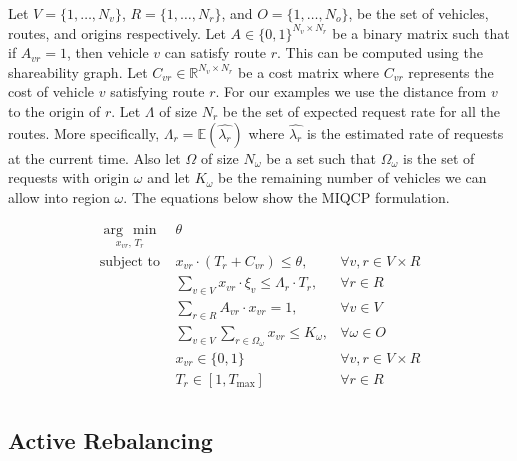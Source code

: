 \documentclass[letterpaper, 10pt, conference]{ieeeconf}
\newcommand{\argmin}[1]{\underset{#1}{\operatorname{arg}\,\operatorname{min}}\;}
\newcommand{\Max}[1]{\underset{#1}{\operatorname{max}}\;}
\newcommand{\Sum}[1]{\displaystyle\sum\limits_{#1}}
\begin{document}
Let $V = \{1, \ldots, N_v\}$, $R = \{1, \ldots, N_r\}$, and $O = \{1, \ldots,
N_o\}$, be the set of vehicles, routes, and origins respectively. Let $A \in
\{0, 1\}^{N_v \times N_r}$ be a binary matrix such that if $A_{vr} = 1$, then
vehicle $v$ can satisfy route $r$. This can be computed using the shareability
graph.  Let $C_{vr} \in \mathbb{R}^{N_v \times N_r}$ be a cost matrix where
$C_{vr}$ represents the cost of vehicle $v$ satisfying route $r$. For our
examples we use the distance from $v$ to the origin of $r$. Let $\Lambda$ of
size $N_r$ be the set of expected request rate for all the routes. More
specifically, $\Lambda_r = \mathbb{E}(\hat{\lambda_r})$ where $\hat{\lambda_r}$
is the estimated rate of requests at the current time. Also let $\Omega$ of
size $N_\omega$ be a set such that $\Omega_\omega$ is the set of requests with
origin $\omega$ and let $K_{\omega}$ be the remaining number of vehicles we can
allow into region $\omega$. The equations below show the MIQCP formulation.

\begin{equation*}
\begin{array}{lll}
\argmin{x_{vr}, \,T_r}  & \theta &\\
\text{subject to}
    & x_{vr} \cdot (T_r + C_{vr}) \leq \theta,
    & \forall v, r \in V \times R\\
    & \Sum{v \in V} x_{vr} \cdot \xi_v \leq \Lambda_r \cdot T_r,
    & \forall r \in R \\
    & \Sum{r \in R} A_{vr} \cdot x_{vr} = 1,  &\forall v \in V \\
    & \Sum{v \in V} \Sum{r \in \Omega_{\omega}} x_{vr} \leq K_{\omega},  &\forall \omega \in O\\
    & x_{vr} \in \{0,1\} & \forall v, r \in V \times R\\
    & T_{r} \in [1, T_{\max}] & \forall r \in R \\
\end{array}
\end{equation*}

\subsection{Active Rebalancing}
\end{document}
